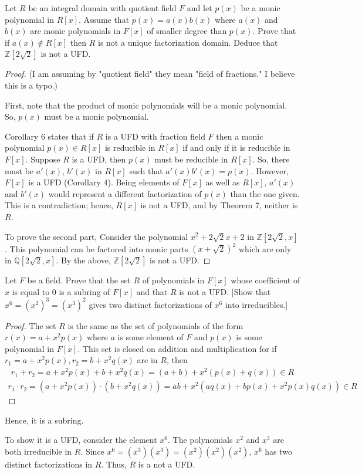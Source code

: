 \documentclass[10pt]{article}
\newenvironment{problem}[2][Problem]{\begin{trivlist}
		\item[\hskip \labelsep {\bfseries #1}\hskip \labelsep {\bfseries #2.}]}{\end{trivlist}}
\begin{document}
	\begin{problem}{3.1} 
		Let $R$ be an integral domain with quotient field $F$ and let $p(x)$ be a monic polynomial in $R[x]$. Assume that $p(x) = a(x)b(x)$ where $a(x)$ and $b(x)$ are monic polynomials in $F[x]$ of smaller degree than $p(x)$. Prove that if $a(x) \not \in R[x]$ then $R$ is not a unique factorization domain. Deduce that $\mathbb{Z}[2 \sqrt{2}]$ is not a UFD.
		\begin{proof}
			(I am assuming by "quotient field" they mean "field of fractions." I believe this is a typo.) 
			
			
			First, note that the product of monic polynomials will be a monic polynomial. So, $p(x)$ must be a monic polynomial.
			
			Corollary 6 states that if $R$ is a UFD with fraction field $F$ then a monic polynomial $p(x)\in R[x]$ is reducible in $R[x]$ if and only if it is reducible in $F[x]$. Suppose $R$ is a UFD, then $p(x)$ must be reducible in $R[x]$. So, there must be $a'(x)$, $b'(x)$ in $R[x]$ such that $a'(x)b'(x) = p(x)$. However, $F[x]$ is a UFD (Corollary 4). Being elements of $F[x]$ as well as $R[x]$, $a'(x)$ and $b'(x)$ would represent a different factorization of $p(x)$ than the one given. This is a contradiction; hence, $R[x]$ is not a UFD, and by Theorem 7, neither is $R$.
			
			To prove the second part, Consider the polynomial $x^2 + 2\sqrt{2}x + 2$ in $\mathbb{Z}[2\sqrt{2},x]$. This polynomial can be factored into monic parts $(x + \sqrt{2})^2$ which are only in $\mathbb{Q}[2\sqrt{2},x]$. By the above, $\mathbb{Z}[2\sqrt{2}]$ is not a UFD.
		\end{proof}
	\end{problem}
	
	\begin{problem}{3.3}
		Let $F$ be a field. Prove that the set $R$ of polynomials in $F[x]$ whose coefficient of $x$ is equal to $0$ is a subring of $F[x]$ and that $R$ is not a UFD. [Show that $x^6=(x^2)^3=(x^3)^2$ gives two distinct factorizations of $x^6$ into irreducibles.]
		\begin{proof}
			The set $R$ is the same as the set of polynomials of the form $r(x) = a + x^2p(x)$ where $a$ is some element of $F$ and $p(x)$ is some polynomial in $F[x]$. This set is closed on addition and multiplication for if $r_1 = a+x^2p(x), r_2=b+x^2q(x)$ are in $R$, then 
			\begin{align*}
				r_1+r_2 = a+x^2p(x) + b+x^2q(x) = (a+b) + x^2(p(x) + q(x)) \in R
			\end{align*}
			\begin{align*}
				r_1 \cdot r_2 = (a+x^2p(x)) \cdot (b+x^2q(x)) = ab + x^2(aq(x) + bp(x) + x^2p(x)q(x)) \in R
			\end{align*}
		\end{proof}
		Hence, it is a subring.
		
		To show it is a UFD, consider the element $x^6$. The polynomials $x^2$ and $x^3$ are both irreducible in $R$. Since $x^6 = (x^3)(x^3) = (x^2)(x^2)(x^2)$, $x^6$ has two distinct factorizations in $R$. Thus, $R$ is a not a UFD.
	\end{problem}
	
\end{document}
